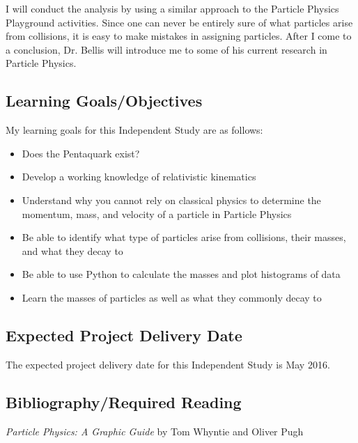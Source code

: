 \documentclass[12pt]{article} %
\begin{document}
I will conduct the analysis by using a similar approach to the Particle Physics Playground activities. Since one can never be entirely sure of what particles arise from collisions, it is easy to make mistakes in assigning particles. After I come to a conclusion, Dr. Bellis will introduce me to some of his current research in Particle Physics.


\subsection{Learning Goals/Objectives} %

My learning goals for this Independent Study are as follows:
\begin{itemize}
  \item Does the Pentaquark exist?
  \item Develop a working knowledge of relativistic kinematics
  \item Understand why you cannot rely on classical physics to determine the momentum, mass, and velocity of a particle in Particle Physics
  \item Be able to identify what type of particles arise from collisions, their masses, and what they decay to
  \item Be able to use Python to calculate the masses and plot histograms of data
  \item Learn the masses of particles as well as what they commonly decay to
\end{itemize}


\subsection{Expected Project Delivery Date} %

The expected project delivery date for this Independent Study is May 2016.


\subsection{Bibliography/Required Reading} %

{\it Particle Physics: A Graphic Guide} by Tom Whyntie and Oliver Pugh
\end{document}
